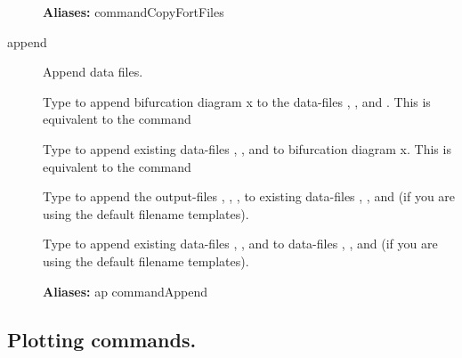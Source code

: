\documentclass[12pt]{report}
\begin{document}
\begin{description}
\textbf{Aliases:} commandCopyFortFiles

\item[append]

Append data files.

    Type  to append bifurcation diagram x
    to the data-files , , and . This is equivalent to
    the command\\

    Type  to append existing data-files , ,
    and  to bifurcation diagram x. This is equivalent to
    the command\\

    Type  to append the output-files , ,
    , to existing data-files , , and  (if you are
    using the default filename templates).

    Type  to append existing data-files , ,
    and  to data-files , , and
     (if you are using the default filename templates).

    \textbf{Aliases:} ap commandAppend
\end{description}

\subsection{Plotting commands.} \label{sec:clui_ref_plot}
\end{document}
